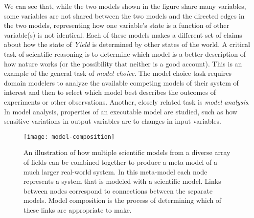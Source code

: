 We can see that, while the two %
models shown in the figure share many variables, some variables are not shared between the two models and the directed edges in the two models, representing how one variable’s state is a function of other variable(s) is not identical.
Each of these models makes a different set of claims about how the state of \emph{Yield} is determined by other states of the world.
A critical task of scientific reasoning is to determine which model is a better description of how nature works (or the possibility that neither is a good account).
This is an example of the general task of \textit{model choice}.
The model choice task requires domain modelers to analyze the available competing models of their system of interest and then to select which model best describes the outcomes of experiments or other observations.
Another, closely related task is \emph{model analysis}.
In model analysis, properties of an executable model are studied, such as how sensitive variations in output variables are to changes in input variables. 


\begin{figure}[!htbp]
  \centering
  \texttt{[image: model-composition]}
  \caption[Model Composition Web]{An illustration of how multiple scientific models from a diverse array of fields can be combined together to produce a meta-model of a much larger real-world system. In this meta-model each node represents a system that is modeled with a scientific model. Links between nodes correspond to connections between the separate models. Model composition is the process of determining which of these links are appropriate to make.}
  \label{fig:composition_example}
\end{figure}

